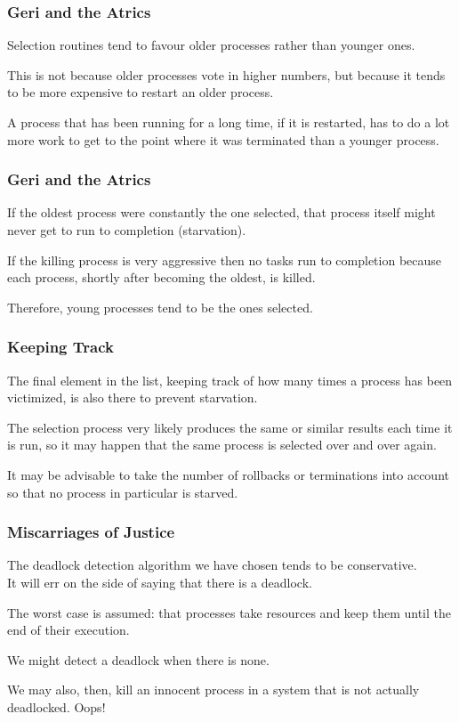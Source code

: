 \begin{frame}
	\frametitle{Geri and the Atrics}

	Selection routines tend to favour older processes rather than younger ones.

	This is not because older processes vote in higher numbers, but because it tends to be more expensive to restart an older process.

	A process that has been running for a long time, if it is restarted, has to do a lot more work to get to the point where it was terminated than a younger process.

\end{frame}

\begin{frame}
	\frametitle{Geri and the Atrics}

	If the oldest process were constantly the one selected, that process itself might never get to run to completion (starvation).

	If the killing process is very aggressive then no tasks run to completion because each process, shortly after becoming the oldest, is killed.


	Therefore, young processes tend to be the ones selected.

\end{frame}

\begin{frame}
	\frametitle{Keeping Track}

	The final element in the list, keeping track of how many times a process has been victimized, is also there to prevent starvation.

	The selection process very likely produces the same or similar results each time it is run, so it may happen that the same process is selected over and over again.

	It may be advisable to take the number of rollbacks or terminations into account so that no process in particular is starved.

\end{frame}

\begin{frame}
	\frametitle{Miscarriages of Justice}

	The deadlock detection algorithm we have chosen tends to be conservative.\\
	\quad It will err on the side of saying that there is a deadlock.

	The worst case is assumed: that processes take resources and keep them until the end of their execution.

	We might detect a deadlock when there is none.

	We may also, then, kill an innocent process in a system that is not actually deadlocked. Oops!

\end{frame}

